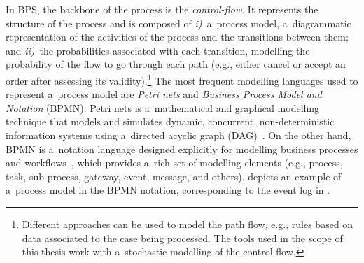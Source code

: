 \documentclass[12pt]{article}
\begin{document}
In BPS, the backbone of the process is the \emph{control-flow}. It represents the structure of the process and is composed of \textit{i)}~a~process model, a~diagrammatic representation of the activities of the process and the transitions between them; and \textit{ii)}~the probabilities associated with each transition, modelling the probability of the flow to go through each path (e.g., either cancel or accept an order after assessing its validity).\footnote{Different approaches can be used to model the path flow, e.g., rules based on data associated to the case being processed. The tools used in the scope of this thesis work with a~stochastic modelling of the control-flow.} The most frequent modelling languages used to represent a~process model are \emph{Petri nets} and \emph{Business Process Model and Notation} (BPMN). Petri nets is a~mathematical and graphical modelling technique that models and simulates dynamic, concurrent, non-deterministic information systems using a~directed acyclic graph (DAG)~\cite{murata_petri_1989}. On the other hand, BPMN is a~notation language designed explicitly for modelling business processes and workflows~\cite{noauthor_bpmn_2014}, which provides a~rich set of modelling elements (e.g., process, task, sub-process, gateway, event, message, and others).  depicts an example of a~process model in the BPMN notation, corresponding to the event log in .
\end{document}
